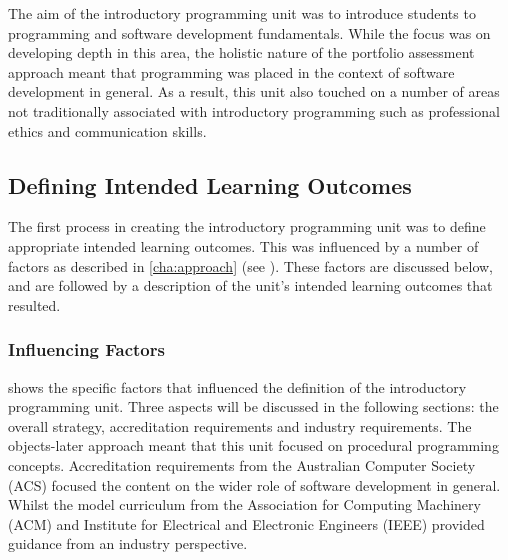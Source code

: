 The aim of the introductory programming unit was to introduce students to programming and software development fundamentals. While the focus was on developing depth in this area, the holistic nature of the portfolio assessment approach meant that programming was placed in the context of software development in general. As a result, this unit also touched on a number of areas not traditionally associated with introductory programming such as professional ethics and communication skills.



\subsection{Defining Intended Learning Outcomes} %
\label{sec:intro:intended_learning_outcomes}

The first process in creating the introductory programming unit was to define appropriate intended learning outcomes. This was influenced by a number of factors as described in \cref{cha:approach} (see ). These factors are discussed below, and are followed by a description of the unit's intended learning outcomes that resulted.

\subsubsection{Influencing Factors} %
\label{ssub:influencing_factors}

 shows the specific factors that influenced the definition of the introductory programming unit. Three aspects will be discussed in the following sections: the overall strategy, accreditation requirements and industry requirements. The objects-later approach meant that this unit focused on procedural programming concepts. Accreditation requirements from the Australian Computer Society (ACS) focused the content on the wider role of software development in general. Whilst the model curriculum from the Association for Computing Machinery (ACM) and Institute for Electrical and Electronic Engineers (IEEE) provided guidance from an industry perspective.

